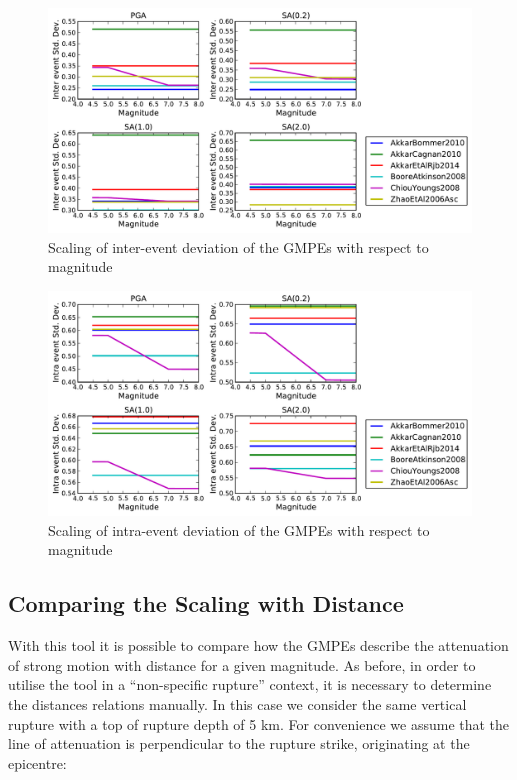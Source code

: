 \begin{figure}[htb]
	\centering
		\includegraphics[width=\textwidth]{./figures/trellis/magnitude_inter_sigma_imt_trellis_simple.pdf}
	\caption{Scaling of inter-event deviation of the GMPEs with respect to magnitude}
	\label{fig:magnitude_inter_sigma_trellis_simple}
\end{figure}
\begin{figure}[htb]
	\centering
		\includegraphics[width=\textwidth]{./figures/trellis/magnitude_intra_sigma_imt_trellis_simple.pdf}
	\caption{Scaling of intra-event deviation of the GMPEs with respect to magnitude}
	\label{fig:magnitude_intra_sigma_trellis_simple}
\end{figure}

\subsection{Comparing the Scaling with Distance}

With this tool it is possible to compare how the GMPEs describe the attenuation of strong motion with distance for a given magnitude. As before, in order to utilise the tool in a ``non-specific rupture'' context, it is necessary to determine the distances relations manually. In this case we consider the same vertical rupture with a top of rupture depth of 5 km. For convenience we assume that the line of attenuation is perpendicular to the rupture strike, originating at the epicentre:

